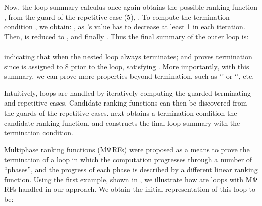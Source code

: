 \documentclass[acmsmall,screen,review,anonymous,nonacm]{acmart}
\begin{document}
Now, the loop summary calculus once again obtains the possible ranking function , from the 
guard of the repetitive case (5), \ie
{}. 
To compute the termination condition \wrt {}, we obtain:
, as 's value has to decrease at least 1 in each iteration. 
Then, 
 is reduced to 
, and finally 
. Thus the final summary of the outer loop is: 
\\[0.2em] 
{
}
\\[0.2em] 
indicating that when  the nested loop always terminates; and \toolName proves {termination} since  is assigned to 8 prior to the loop, satisfying . 
More importantly, with this summary, we can prove more properties beyond termination, such as `' or `', etc. 

Intuitively, loops are handled by iteratively computing the guarded terminating and repetitive cases. Candidate ranking functions can then be discovered from the guards of the repetitive cases. 
\toolName next obtains a termination condition \wrt the candidate ranking function, and constructs the final loop summary with the termination condition. 







Multiphase ranking functions (M${\mathrm{\Phi}}$RFs) \cite{DBLP:conf/cav/Ben-AmramG17} were proposed as a means to prove the termination of a loop in which the computation progresses through a number of ``phases'', and the progress of each phase is described by a different linear
ranking function. 
Using the first example, shown in , 
we illustrate how are loops with M${\mathrm{\Phi}}$RFs handled in our approach. 
We obtain the initial representation of this loop to be:
\end{document}
